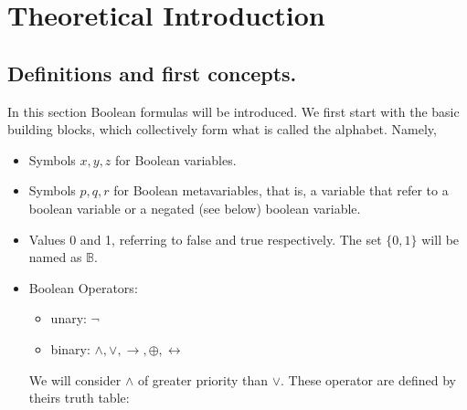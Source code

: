 
\chapter{Theoretical Introduction} %

\label{Chapter1} %


\newcommand{\keyword}[1]{\textbf{#1}}
\newcommand{\tabhead}[1]{\textbf{#1}}
\newcommand{\code}[1]{\texttt{#1}}
\newcommand{\file}[1]{\texttt{\bfseries#1}}
\newcommand{\option}[1]{\texttt{\itshape#1}}

\section{Definitions and first concepts.}
In this section Boolean formulas will be introduced. We first start with the basic building blocks, which collectively form what is called  the alphabet. Namely,
\begin{itemize}
\item Symbols $x,y,z$ for Boolean variables.
\item Symbols $p,q,r$ for Boolean metavariables, that is, a variable that refer to a boolean variable or a negated (see below) boolean variable.
\item Values 0 and 1, referring to false  and true respectively. The set $\{0,1\}$ will be named as $\mathbb{B}$.

\item Boolean Operators: 
\begin{itemize}
	\item unary: $\neg $
	\item binary: $\wedge, \vee, \rightarrow, \oplus, \leftrightarrow $
\end{itemize}


We will consider $\wedge$ of greater priority than $\vee$. These operator are defined by theirs truth table:

\end{itemize}

